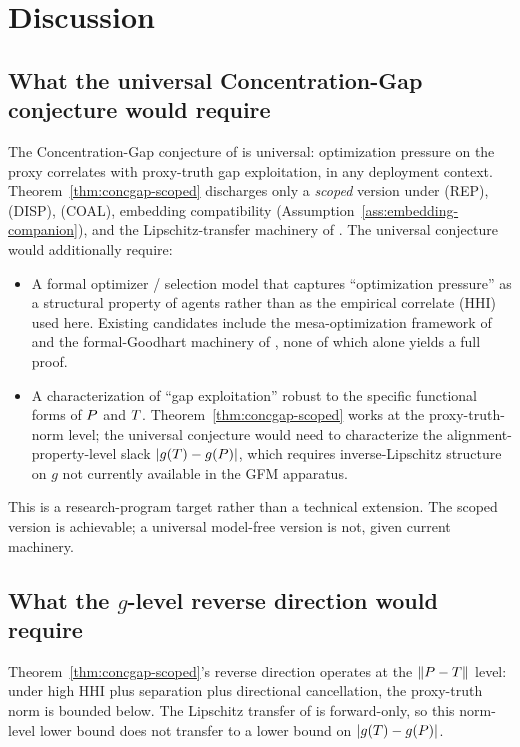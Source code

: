\section{Discussion}
\label{sec:discussion}

\subsection{What the universal Concentration-Gap conjecture would require}

The Concentration-Gap conjecture of
\citep[Microfoundation]{lasser2026micro} is universal:
optimization pressure on the proxy correlates with proxy-truth gap
exploitation, in any deployment context.
Theorem~\ref{thm:concgap-scoped} discharges only a \emph{scoped}
version under (REP), (DISP), (COAL), embedding compatibility
(Assumption~\ref{ass:embedding-companion}), and the
Lipschitz-transfer machinery of \citep{lasser2026micro}. The
universal conjecture would additionally require:

\begin{itemize}
\item A formal optimizer / selection model that captures
  ``optimization pressure'' as a structural property of agents
  rather than as the empirical correlate (HHI) used here. Existing
  candidates include the mesa-optimization framework of
  \citep{hubinger2019risks} and the formal-Goodhart machinery of
  \citep{elmhamdi2024goodhart, majka2025strong}, none of which
  alone yields a full proof.
\item A characterization of ``gap exploitation'' robust to the
  specific functional forms of $P$ and $T$.
  Theorem~\ref{thm:concgap-scoped} works at the proxy-truth-norm
  level; the universal conjecture would need to characterize the
  alignment-property-level slack $|g(T) - g(P)|$,
  which requires inverse-Lipschitz structure on $g$ not currently
  available in the GFM apparatus.
\end{itemize}

This is a research-program target rather than a technical
extension. The scoped version is achievable; a universal
model-free version is not, given current machinery.

\subsection{What the $g$-level reverse direction would require}

Theorem~\ref{thm:concgap-scoped}'s reverse direction operates at
the $\|P - T\|$ level: under high HHI plus separation
plus directional cancellation, the proxy-truth norm is bounded
below. The Lipschitz transfer of \citep[Theorem
2]{lasser2026micro} is forward-only, so this norm-level lower
bound does not transfer to a lower bound on $|g(T) -
g(P)|$.

